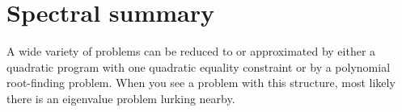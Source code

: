 \documentclass[12pt, leqno]{article} %
\begin{document}
\section*{Spectral summary}

A wide variety of problems can be reduced to or approximated by either
a quadratic program with one quadratic equality constraint or by
a polynomial root-finding problem.  When you see a problem with this
structure, most likely there is an eigenvalue problem lurking nearby.
\end{document}
